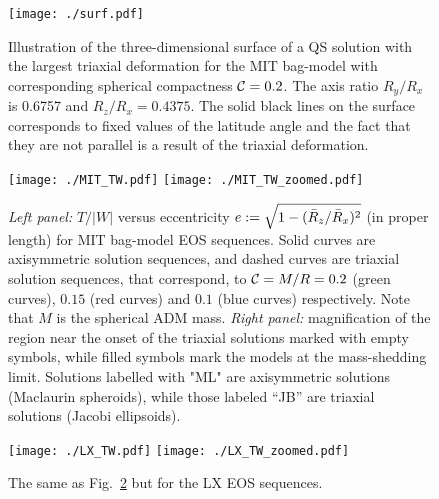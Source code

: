 \documentclass[twocolumn,superscriptaddress,showpacs,prd,aps,amsmath,amssymb,nofootinbib]{revtex4-1}
\begin{document}
\begin{figure}
  \begin{center}
    \texttt{[image: ./surf.pdf]}
  \end{center}
  \caption{Illustration of the three-dimensional surface of a QS solution
    with the largest triaxial deformation for the MIT bag-model with
    corresponding spherical compactness $\mathcal{C}=0.2$. The axis ratio
    $R_y/R_x$ is 0.6757 and $R_z/R_x=0.4375$. The solid black lines on
    the surface corresponds to fixed values of the latitude angle and the
    fact that they are not parallel is a result of the triaxial
    deformation.}
	\label{fig:qs_surf}
\end{figure}

\begin{figure*}
\begin{center}
\texttt{[image: ./MIT\_TW.pdf]}
\texttt{[image: ./MIT\_TW\_zoomed.pdf]}
\end{center}
\caption{\textit{Left panel:} $T/|W|$ versus eccentricity
  $e:=\sqrt{1-({\bar R}_z/{\bar R}_x)^2}$ (in proper length) for MIT bag-model EOS
  sequences. Solid curves are axisymmetric solution sequences, and dashed
  curves are triaxial solution sequences, that correspond, to
  $\mathcal{C}=M/R=0.2$ (green curves), $0.15$ (red curves) and $0.1$ (blue
  curves) respectively. Note that $M$ is the spherical ADM mass.
  \textit{Right panel:} magnification of the region near the onset of the
  triaxial solutions marked with empty symbols, while filled symbols mark
  the models at the mass-shedding limit. Solutions labelled with "ML" are
  axisymmetric solutions (Maclaurin spheroids), while those labeled
  ``JB'' are triaxial solutions (Jacobi ellipsoids). }
\label{fig:plot_mit}
\end{figure*}


\begin{figure*}
\begin{center}
\texttt{[image: ./LX\_TW.pdf]}
\texttt{[image: ./LX\_TW\_zoomed.pdf]}
\end{center}
\caption{The same as Fig.~\ref{fig:plot_mit} but for the LX EOS sequences.}
\label{fig:plot_lx}
\end{figure*}

\end{document}
